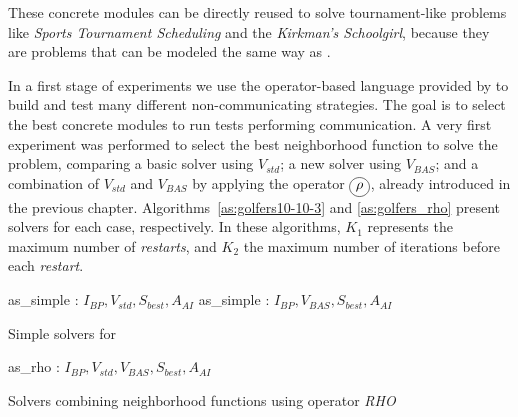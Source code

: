 These concrete modules can be directly reused to solve tournament-like problems like \textit{Sports Tournament Scheduling} and the \textit{Kirkman's Schoolgirl}, because they are problems that can be modeled the same way as \SGP.

In a first stage of experiments we use the operator-based language provided by \posl{} to build and test many different non-communicating strategies. The goal is to select the best concrete modules to run tests performing communication. A very first experiment was performed to select the best neighborhood function to solve the problem, comparing a basic solver using $V_{std}$; a new solver using $V_{BAS}$; and a combination of $V_{std}$ and $V_{BAS}$ by applying the operator $\circled{$\rho$}$, already introduced in the previous chapter. Algorithms~\ref{as:golfers10-10-3} and \ref{as:golfers_rho} present solvers for each case, respectively. In these algorithms, $K_1$ represents the maximum number of {\it restarts}, and $K_2$ the maximum number of iterations before each \textit{restart}.

\begin{algorithm}[t]
\dontprintsemicolon
\SetNoline
{}
   as\_simple\;
\algoindent {} : $I_{BP}, V_{std}, S_{best}, A_{AI}$ \;
   as\_simple\;
\algoindent {} : $I_{BP}, V_{BAS}, S_{best}, A_{AI}$ \; 
\caption{Simple solvers for \SGP}\label{as:golfers10-10-3}
\end{algorithm}

\begin{algorithm}[H]
\dontprintsemicolon
\SetNoline
{}
   as\_rho\;
\algoindent {} : $I_{BP}, V_{std}, V_{BAS}, S_{best}, A_{AI}$ \;
\caption{Solvers combining neighborhood functions using operator {\it RHO}}\label{as:golfers_rho}
\end{algorithm}

